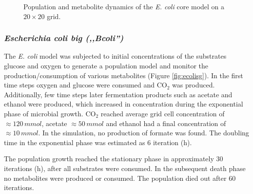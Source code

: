 \begin{figure}[h!]
{\begin{minipage}[t]{0.3\textwidth}
  \end{minipage}
  }
  \caption{Population and metabolite dynamics of the \emph{E. coli} core model on a $20\times20$ grid.}
  \label{fig:ecoregrids}
\end{figure}

\subsubsection{\textit{Escherichia coli big (,,Bcoli'')}}
The \textit{E. coli} model was subjected to initial concentrations of the substrates glucose and oxygen to generate a population model and monitor the production/consumption of various metabolites (Figure \hyperref[fig:ecolisg]{\ref{fig:ecolisg}}). In the first time steps oxygen and glucose were consumed and CO$_2$ was produced. Additionally, few time steps later fermentation products such as acetate and ethanol were produced, which increased in concentration during the exponential phase of microbial growth. 
CO$_2$ reached average grid cell concentration of $\approx 120\, mmol$, acetate $\approx 50\, mmol$ and ethanol had a final concentration of $\approx 10\,mmol$.
In the simulation, no production of formate was found. The doubling time in the exponential phase was estimated as 6 iteration (h).

The population growth reached the stationary phase in approximately 30 iterations (h), after all substrates were consumed. In the subsequent death phase no metabolites were produced or consumed. The population died out after 60 iterations.

